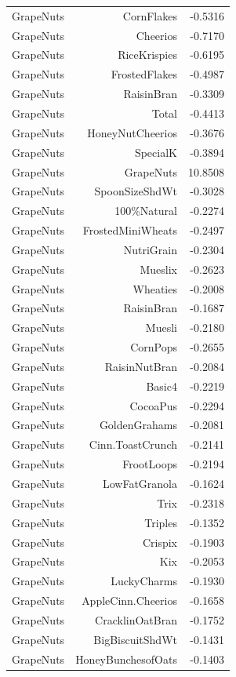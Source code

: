 \begin{longtable}{@{}lrr@{}}
GrapeNuts & CornFlakes & -0.5316 \\
GrapeNuts & Cheerios & -0.7170 \\
GrapeNuts & RiceKrispies & -0.6195 \\
GrapeNuts & FrostedFlakes & -0.4987 \\
GrapeNuts & RaisinBran & -0.3309 \\
GrapeNuts & Total & -0.4413 \\
GrapeNuts & HoneyNutCheerios & -0.3676 \\
GrapeNuts & SpecialK & -0.3894 \\
GrapeNuts & GrapeNuts & 10.8508 \\
GrapeNuts & SpoonSizeShdWt & -0.3028 \\
GrapeNuts & 100\%Natural & -0.2274 \\
GrapeNuts & FrostedMiniWheats & -0.2497 \\
GrapeNuts & NutriGrain & -0.2304 \\
GrapeNuts & Mueslix & -0.2623 \\
GrapeNuts & Wheaties & -0.2008 \\
GrapeNuts & RaisinBran & -0.1687 \\
GrapeNuts & Muesli & -0.2180 \\
GrapeNuts & CornPops & -0.2655 \\
GrapeNuts & RaisinNutBran & -0.2084 \\
GrapeNuts & Basic4 & -0.2219 \\
GrapeNuts & CocoaPus & -0.2294 \\
GrapeNuts & GoldenGrahams & -0.2081 \\
GrapeNuts & Cinn.ToastCrunch & -0.2141 \\
GrapeNuts & FrootLoops & -0.2194 \\
GrapeNuts & LowFatGranola & -0.1624 \\
GrapeNuts & Trix & -0.2318 \\
GrapeNuts & Triples & -0.1352 \\
GrapeNuts & Crispix & -0.1903 \\
GrapeNuts & Kix & -0.2053 \\
GrapeNuts & LuckyCharms & -0.1930 \\
GrapeNuts & AppleCinn.Cheerios & -0.1658 \\
GrapeNuts & CracklinOatBran & -0.1752 \\
GrapeNuts & BigBiscuitShdWt & -0.1431 \\
GrapeNuts & HoneyBunchesofOats & -0.1403 \\

\end{longtable}
